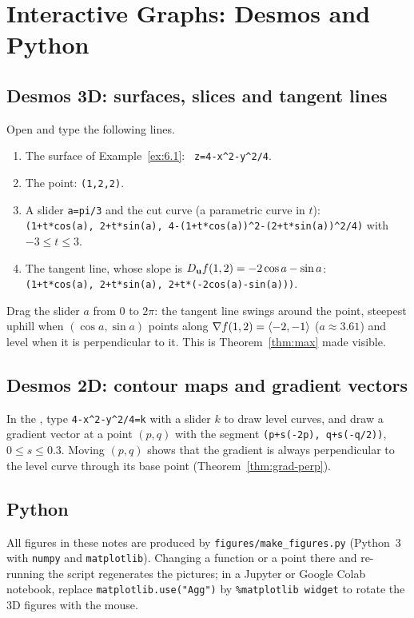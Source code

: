 \section{Interactive Graphs: Desmos and Python}\label{app:interactive}

\subsection{Desmos 3D: surfaces, slices and tangent lines}

Open  and type the following lines.
\begin{enumerate}
\item The surface of Example~\ref{ex:6.1}: \ \texttt{z=4-x\^{}2-y\^{}2/4}.
\item The point: \texttt{(1,2,2)}.
\item A slider \texttt{a=pi/3} and the cut curve (a parametric curve in $t$):\\
      \texttt{(1+t*cos(a), 2+t*sin(a), 4-(1+t*cos(a))\^{}2-(2+t*sin(a))\^{}2/4)}
      with $-3\le t\le3$.
\item The tangent line, whose slope is $D_{\mathbf{u}} f(1,2)=-2\cos a-\sin a$:\\
      \texttt{(1+t*cos(a), 2+t*sin(a), 2+t*(-2cos(a)-sin(a)))}.
\end{enumerate}
Drag the slider $a$ from $0$ to $2\pi$: the tangent line swings around the
point, steepest uphill when $(\cos a,\sin a)$ points along
$\nabla f(1,2)=\left\langle -2,-1 \right\rangle$ ($a\approx3.61$) and level when it is perpendicular
to it. This is Theorem~\ref{thm:max} made visible.

\subsection{Desmos 2D: contour maps and gradient vectors}

In the , type
\texttt{4-x\^{}2-y\^{}2/4=k} with a slider $k$ to draw level curves, and draw a
gradient vector at a point $(p,q)$ with the segment
\texttt{(p+s(-2p), q+s(-q/2))}, $0\le s\le0.3$. Moving $(p,q)$ shows that the
gradient is always perpendicular to the level curve through its base point
(Theorem~\ref{thm:grad-perp}).

\subsection{Python}

All figures in these notes are produced by \texttt{figures/make\_figures.py}
(Python~3 with \texttt{numpy} and \texttt{matplotlib}). Changing a function or a
point there and re-running the script regenerates the pictures; in a Jupyter or
Google Colab notebook, replace \texttt{matplotlib.use("Agg")} by
\texttt{\%matplotlib widget} to rotate the 3D figures with the mouse.
